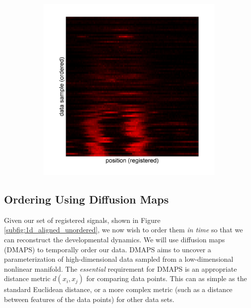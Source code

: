 \documentclass[11pt]{article}
\begin{document}
\begin{figure}
\begin{subfigure}{0.2\textwidth}
\caption{}
\label{subfig:1d_aligned_ordered}
\end{subfigure}
\begin{subfigure}{0.2\textwidth}
\includegraphics[width=\textwidth]{registered_ordered_vdm_1d}
\caption{}
\label{subfig:1d_aligned_ordered_vdm}
\end{subfigure}
\caption{}
\label{fig:1d_demo}
\end{figure}


\subsection{Ordering Using Diffusion Maps}

Given our set of registered signals, shown in Figure \ref{subfig:1d_aligned_unordered}, we now wish to order them {\em in time} so that we can reconstruct the developmental dynamics.
%
We will use diffusion maps (DMAPS) \cite{coifman2005geometric} to temporally order our data.
%
DMAPS aims to uncover a parameterization of high-dimensional data sampled from a low-dimensional nonlinear manifold.
%
The {\em essential} requirement for DMAPS is an appropriate distance metric $d(x_i, x_j)$ for comparing data points. 
%
This can as simple as the standard Euclidean distance, or a more complex metric (such as a distance between features of the data points) for other data sets.
\end{document}

